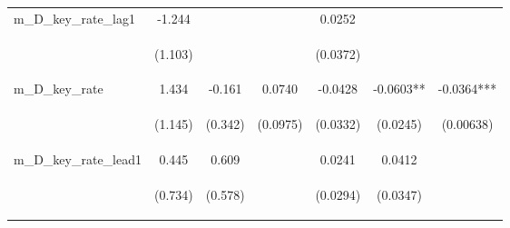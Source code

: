 \documentclass[]{article}
\begin{document}
\begin{center}
\begin{tabular}{lcccccc}
m\_D\_key\_rate\_lag1 & -1.244 &  &  & 0.0252 &  &  \\
\vspace{4pt} & \begin{footnotesize}(1.103)\end{footnotesize} & \begin{footnotesize}\end{footnotesize} & \begin{footnotesize}\end{footnotesize} & \begin{footnotesize}(0.0372)\end{footnotesize} & \begin{footnotesize}\end{footnotesize} & \begin{footnotesize}\end{footnotesize} \\
m\_D\_key\_rate & 1.434 & -0.161 & 0.0740 & -0.0428 & -0.0603** & -0.0364*** \\
\vspace{4pt} & \begin{footnotesize}(1.145)\end{footnotesize} & \begin{footnotesize}(0.342)\end{footnotesize} & \begin{footnotesize}(0.0975)\end{footnotesize} & \begin{footnotesize}(0.0332)\end{footnotesize} & \begin{footnotesize}(0.0245)\end{footnotesize} & \begin{footnotesize}(0.00638)\end{footnotesize} \\
m\_D\_key\_rate\_lead1 & 0.445 & 0.609 &  & 0.0241 & 0.0412 &  \\
\vspace{4pt} & \begin{footnotesize}(0.734)\end{footnotesize} & \begin{footnotesize}(0.578)\end{footnotesize} & \begin{footnotesize}\end{footnotesize} & \begin{footnotesize}(0.0294)\end{footnotesize} & \begin{footnotesize}(0.0347)\end{footnotesize} & \begin{footnotesize}\end{footnotesize} \\

\end{tabular}
\end{center}
\end{document}
